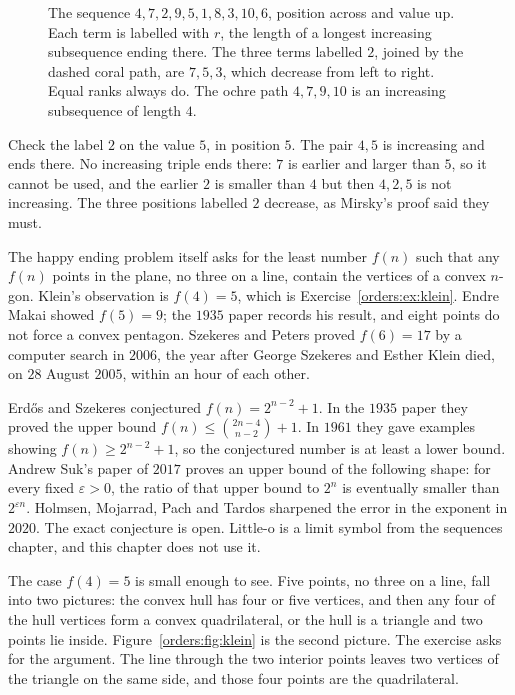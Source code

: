 \begin{figure}[ht]
\centering
{}
\caption{The sequence $4,7,2,9,5,1,8,3,10,6$, position across and value up. Each term is labelled with $r$, the length of a longest increasing subsequence ending there. The three terms labelled $2$, joined by the dashed coral path, are $7,5,3$, which decrease from left to right. Equal ranks always do. The ochre path $4,7,9,10$ is an increasing subsequence of length $4$.}
\label{orders:fig:es}
\end{figure}

Check the label $2$ on the value $5$, in position $5$. The pair $4,5$ is increasing and ends there. No increasing triple ends there: $7$ is earlier and larger than $5$, so it cannot be used, and the earlier $2$ is smaller than $4$ but then $4,2,5$ is not increasing. The three positions labelled $2$ decrease, as Mirsky's proof said they must.

\begin{remark}
The happy ending problem itself asks for the least number $f(n)$ such that any $f(n)$ points in the plane, no three on a line, contain the vertices of a convex $n$-gon. Klein's observation is $f(4)=5$, which is Exercise~\ref{orders:ex:klein}. Endre Makai showed $f(5)=9$; the $1935$ paper records his result, and eight points do not force a convex pentagon. Szekeres and Peters proved $f(6)=17$ by a computer search in $2006$, the year after George Szekeres and Esther Klein died, on $28$ August $2005$, within an hour of each other.

Erd\H os and Szekeres conjectured $f(n)=2^{n-2}+1$. In the $1935$ paper they proved the upper bound $f(n)\le\binom{2n-4}{n-2}+1$. In $1961$ they gave examples showing $f(n)\ge 2^{n-2}+1$, so the conjectured number is at least a lower bound. Andrew Suk's paper of $2017$ proves an upper bound of the following shape: for every fixed $\varepsilon>0$, the ratio of that upper bound to $2^n$ is eventually smaller than $2^{\varepsilon n}$. Holmsen, Mojarrad, Pach and Tardos sharpened the error in the exponent in $2020$. The exact conjecture is open. Little-o is a limit symbol from the sequences chapter, and this chapter does not use it.
\end{remark}

The case $f(4)=5$ is small enough to see. Five points, no three on a line, fall into two pictures: the convex hull has four or five vertices, and then any four of the hull vertices form a convex quadrilateral, or the hull is a triangle and two points lie inside. Figure~\ref{orders:fig:klein} is the second picture. The exercise asks for the argument. The line through the two interior points leaves two vertices of the triangle on the same side, and those four points are the quadrilateral.

